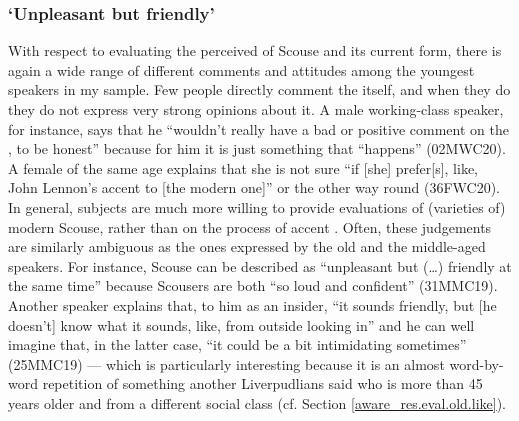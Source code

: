 \subsubsection{`Unpleasant but friendly'}
\label{aware_res.eval.young.like}

With respect to evaluating the perceived  of Scouse and its current form, there is again a wide range of different comments and attitudes among the youngest speakers in my sample.
Few people directly comment the  itself, and when they do they do not express very strong opinions about it.
A male working-class speaker, for instance, says that he ``wouldn't really have a bad or positive comment on the , to be honest'' because for him it is just something that ``happens'' (02MWC20).
A female of the same age explains that she is not sure ``if [she] prefer[s], like, John Lennon's accent to [the modern one]'' or the other way round (36FWC20).
In general, subjects are much more willing to provide evaluations of (varieties of) modern Scouse, rather than on the process of accent .
Often, these judgements are similarly ambiguous as the ones expressed by the old and the middle-aged speakers.
For instance, Scouse can be described as ``unpleasant but (\ldots) friendly at the same time'' because Scousers are both ``so loud and confident'' (31MMC19).
Another speaker explains that, to him as an insider, ``it sounds friendly, but [he doesn't] know what it sounds, like, from outside looking in'' and he can well imagine that, in the latter case, ``it could be a bit intimidating sometimes'' (25MMC19) --- which is particularly interesting because it is an almost word-by-word repetition of something another Liverpudlians said who is more than 45 years older and from a different social class (cf. Section \ref{aware_res.eval.old.like}).

